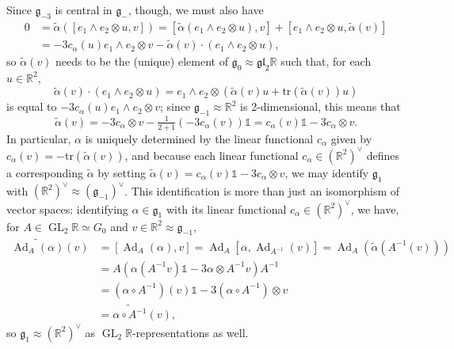 \documentclass[12pt,a4paper]{amsart}
\theoremstyle{definition}
\DeclareMathOperator{\Ad}{Ad}
\DeclareMathOperator{\GLin}{GL}
\begin{document}
Since $\mathfrak{g}_{-3}$ is central in $\mathfrak{g}_-$, though, we must also have
\begin{align*}0 & =\tilde{\alpha}([e_1\wedge e_2\otimes u,v])=[\tilde{\alpha}(e_1\wedge e_2\otimes u),v]+[e_1\wedge e_2\otimes u,\tilde{\alpha}(v)] \\ & =-3 c_\alpha(u)e_1\wedge e_2\otimes v-\tilde{\alpha}(v)\cdot(e_1\wedge e_2\otimes u),\end{align*}
so $\tilde{\alpha}(v)$ needs to be the (unique) element of $\mathfrak{g}_0\approx\mathfrak{gl}_2\mathbb{R}$ such that, for each $u\in\mathbb{R}^2$,
\[\tilde{\alpha}(v)\cdot(e_1\wedge e_2\otimes u)=e_1\wedge e_2\otimes(\tilde{\alpha}(v)u+\mathrm{tr}(\tilde{\alpha}(v))u)\]
is equal to $-3 c_\alpha(u)e_1\wedge e_2\otimes v$; since $\mathfrak{g}_{-1}\approx\mathbb{R}^2$ is 2-dimensional, this means that
\[\tilde{\alpha}(v)=-3c_\alpha\otimes v-\tfrac{1}{2+1}(-3c_\alpha(v))\mathds{1}=c_\alpha(v)\mathds{1}-3c_\alpha\otimes v.\]
In particular, $\alpha$ is uniquely determined by the linear functional $c_\alpha$ given by $c_\alpha(v)=-\mathrm{tr}(\tilde{\alpha}(v))$, and because each linear functional $c_\alpha\in(\mathbb{R}^2)^\vee$ defines a corresponding $\tilde{\alpha}$ by setting $\tilde{\alpha}(v)=c_\alpha(v)\mathds{1}-3c_\alpha\otimes v$, we may identify $\mathfrak{g}_1$ with $(\mathbb{R}^2)^\vee\approx(\mathfrak{g}_{-1})^\vee$. This identification is more than just an isomorphism of vector spaces: identifying $\alpha\in\mathfrak{g}_1$ with its linear functional ${c_\alpha\in(\mathbb{R}^2)^\vee}$, we have, for $A\in\GLin_2\mathbb{R}\simeq G_0$ and $v\in\mathbb{R}^2\approx\mathfrak{g}_{-1}$,
\begin{align*}\widetilde{\Ad_A(\alpha)}(v) & =[\Ad_A(\alpha),v]=\Ad_A[\alpha,\Ad_{A^{-1}}(v)]=\Ad_A(\tilde{\alpha}(A^{-1}(v))) \\ & =A\left(\alpha(A^{-1}v)\mathds{1}-3\alpha\otimes A^{-1}v\right)A^{-1} \\ & =(\alpha\circ A^{-1})(v)\mathds{1}-3(\alpha\circ A^{-1})\otimes v \\ & =\widetilde{\alpha\circ A^{-1}}(v),\end{align*}
so $\mathfrak{g}_1\approx(\mathbb{R}^2)^\vee$ as $\GLin_2\mathbb{R}$-representations as well.
\end{document}
